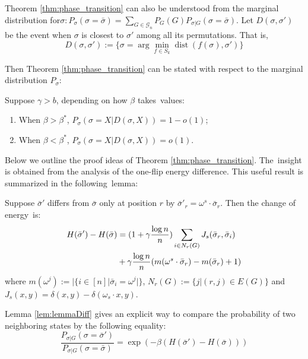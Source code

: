 \documentclass[entropy,article,accept,moreauthors,pdftex]{Definitions/mdpi}
\newcommand{\cG}{\mathcal{G}}
\newcommand{\1}{\mathbbm{1}}
\DeclareMathOperator{\Dist}{dist}
\begin{document}
\begin{paracol}{2}
\switchcolumn


Theorem
\ref{thm:phase_transition} can also be understood from the marginal distribution for\linebreak $\sigma: P_{\sigma}(\sigma =\bar{\sigma})
=\sum_{G \in \cG_n}P_G(G)P_{\sigma |G}(\sigma=\bar{\sigma})$.
Let $D(\sigma, \sigma')$ be the event when $\sigma$ is closest to $\sigma'$ among all its permutations.
That is,
\begin{equation}
D(\sigma, \sigma') := \{ \sigma = \arg\min_{f \in S_k} \Dist(f(\sigma), \sigma')  \}
\end{equation}

Then Theorem \ref{thm:phase_transition} can be stated with respect to the marginal distribution $P_{\sigma}$:
\begin{Corollary}\label{cor:phase4}
Suppose $\gamma > b$, depending on how $\beta$ takes~values:
\begin{enumerate}
	\item When $\beta > \beta^*$, $P_{\sigma}(\sigma = X | D(\sigma, X))  = 1-o(1)$;
	\item When $\beta < \beta^*$, $P_{\sigma}(\sigma = X | D(\sigma, X))  = o(1)$.
\end{enumerate}
\end{Corollary}

Below we outline the proof ideas of Theorem \ref{thm:phase_transition}. The~insight is obtained from the analysis of the one-flip energy difference.
This useful result is summarized in the following~lemma:
\begin{Lemma}\label{lem:lemmaDiff}
	Suppose $\bar{\sigma}'$ differs from $\bar{\sigma}$ only at position $r$ by $\bar{\sigma}'_r = \omega^s \cdot \bar{\sigma}_r$.
	Then the change of energy~is:
\begin{align}
	H(\bar{\sigma}') - H(\bar{\sigma}) &= (1+\gamma \frac{\log n}{n})\sum_{i \in N_r(G)} J_s(\bar{\sigma}_r, \bar{\sigma}_i)
	\notag \\
	&+ \gamma \frac{\log n}{n} (m(\omega^s \cdot \bar{\sigma}_r)-m(\bar{\sigma}_r)+1) \label{eq:DeltaH}
	\end{align}
	where $m(\omega^j) := |\{i \in [n] | \bar{\sigma}_i = \omega^j | \}$, $N_r(G):=\{j | (r, j) \in E(G) \}$ and $J_s(x, y) = \delta(x, y) - \delta(\omega_s \cdot x, y)$.
\end{Lemma}
Lemma \ref{lem:lemmaDiff} gives an explicit way to compare the probability of two neighboring states by the following
equality:
\begin{equation}\label{eq:Pratio}
\frac{P_{\sigma |G } (\sigma = \bar{\sigma}')}{P_{\sigma |G } (\sigma = \bar{\sigma})}
= \exp(-\beta(H(\bar{\sigma}') - H(\bar{\sigma})))
\end{equation}


\end{paracol}
\end{document}
